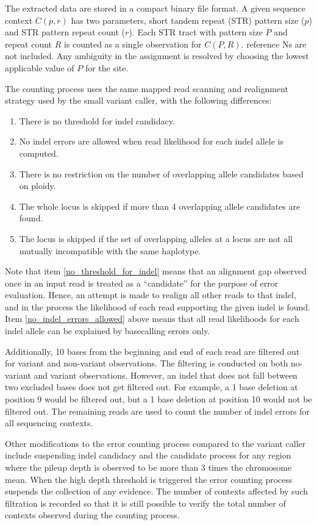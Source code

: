 \documentclass{article}
\begin{document}
The extracted data are stored in a compact binary file format. A given sequence context $C(p,r)$ has two parameters, short tandem repeat (STR) pattern size ($p$) and STR pattern repeat count ($r$). Each STR tract with pattern size $P$ and repeat count $R$ is counted as a single observation for $C(P,R)$. reference Ns are not included. Any ambiguity in the assignment is resolved by choosing the lowest applicable value of $P$ for the site.

The counting process uses the same mapped read scanning and realignment strategy used by the small variant caller, with the following differences:
 \begin{enumerate}
    \item \label{no_threshold_for_indel} There is no threshold for indel candidacy.
    \item \label{no_indel_errors_allowed} No indel errors are allowed when read likelihood for each indel allele is computed.
    \item There is no restriction on the number of overlapping allele candidates based on ploidy.
    \item The whole locus is skipped if more than 4 overlapping allele candidates are found.
    \item The locus is skipped if the set of overlapping alleles at a locus are not all mutually incompatible with the same haplotype.
 \end{enumerate}

Note that item \ref{no_threshold_for_indel} means that an alignment gap observed once in an input read is treated as a ``candidate'' for the purpose of error evaluation. Hence, an attempt is made to realign all other reads to that indel, and in the process the likelihood of each read supporting the given indel is found. Item \ref{no_indel_errors_allowed} above means that all read likelihoods for each indel allele can be explained by basecalling errors only.

Additionally, 10 bases from the beginning and end of each read are filtered out for variant and non-variant observations. The filtering is conducted on both no-variant and variant observations. However, an indel that does not fall between two excluded bases does not get filtered out. For example, a 1 base deletion at position 9 would be filtered out, but a 1 base deletion at position 10 would not be filtered out. The remaining reads are used to count the number of indel errors for all sequencing contexts.

Other modifications to the error counting process compared to the variant caller include suspending indel candidacy and the candidate process for any region where the pileup depth is observed to be more than 3 times the chromosome mean. When the high depth threshold is triggered the error counting process suspends the collection of any evidence. The number of contexts affected by such filtration is recorded so that it is still possible to verify the total number of contexts observed during the counting process.
\end{document}
